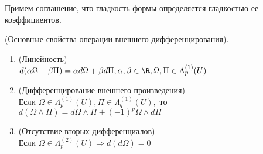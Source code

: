 Примем соглашение, что гладкость формы определяется гладкостью ее коэффициентов.

\begin{theorem}(Основные свойства операции внешнего дифференцирования).
	\begin{enumerate}
		\item(Линейность)\\ $d(\alpha\Omega+\beta\Pi)=\alpha d\Omega+\beta d\Pi, \alpha, \beta\in\R, \Omega, \Pi\in\Lambda_p^{(1)}(U)$
		\item(Дифференцирование внешнего произведения)\\  Если $\Omega\in\Lambda_p^{(1)}(U), \Pi\in\Lambda_q^{(1)}(U),$ то $d(\Omega\wedge\Pi)=d\Omega\wedge\Pi+(-1)^p\Omega\wedge d\Pi$
		\item (Отсутствие вторых дифференциалов) \\ Если $\Omega\in\Lambda_p^{(2)}(U)\Rightarrow d(d\Omega)=0$
	\end{enumerate}
\end{theorem}
